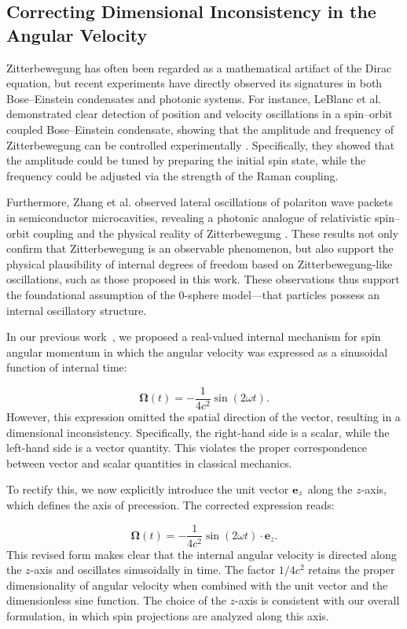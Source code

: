 \documentclass[%
 reprint,
 amsmath,amssymb,
 aps,
]{revtex4-1}
\numberwithin{equation}{section}%
\begin{document}
\subsection{Correcting Dimensional Inconsistency in the Angular Velocity}

Zitterbewegung has often been regarded as a mathematical artifact of the Dirac equation, but recent experiments have directly observed its signatures in both Bose–Einstein condensates and photonic systems. For instance, LeBlanc et al. demonstrated clear detection of position and velocity oscillations in a spin–orbit coupled Bose–Einstein condensate, showing that the amplitude and frequency of Zitterbewegung can be controlled experimentally \cite{leblanc2013}. Specifically, they showed that the amplitude could be tuned by preparing the initial spin state, while the frequency could be adjusted via the strength of the Raman coupling.

Furthermore, Zhang et al. observed lateral oscillations of polariton wave packets in semiconductor microcavities, revealing a photonic analogue of relativistic spin–orbit coupling and the physical reality of Zitterbewegung \cite{zhang2023}. These results not only confirm that Zitterbewegung is an observable phenomenon, but also support the physical plausibility of internal degrees of freedom based on Zitterbewegung-like oscillations, such as those proposed in this work. These observations thus support the foundational assumption of the 0-sphere model—that particles possess an internal oscillatory structure.

In our previous work~\cite{hanamura2309.0047}, we proposed a real-valued internal mechanism for spin angular momentum in which the angular velocity was expressed as a sinusoidal function of internal time:

\begin{equation}
    \boldsymbol{\Omega}(t) = -\frac{1}{4c^2} \sin(2\omega t).
\end{equation}
However, this expression omitted the spatial direction of the vector, resulting in a dimensional inconsistency. Specifically, the right-hand side is a scalar, while the left-hand side is a vector quantity. This violates the proper correspondence between vector and scalar quantities in classical mechanics.

To rectify this, we now explicitly introduce the unit vector ${\bf e}_z$ along the $z$-axis, which defines the axis of precession. The corrected expression reads:

\begin{equation}
    \boldsymbol{\Omega}(t) = -\frac{1}{4c^2} \sin(2\omega t) \cdot \boldsymbol{e}_z.
\end{equation}
This revised form makes clear that the internal angular velocity is directed along the $z$-axis and oscillates sinusoidally in time. The factor $1/4c^2$ retains the proper dimensionality of angular velocity when combined with the unit vector and the dimensionless sine function. The choice of the $z$-axis is consistent with our overall formulation, in which spin projections are analyzed along this axis.
\end{document}
